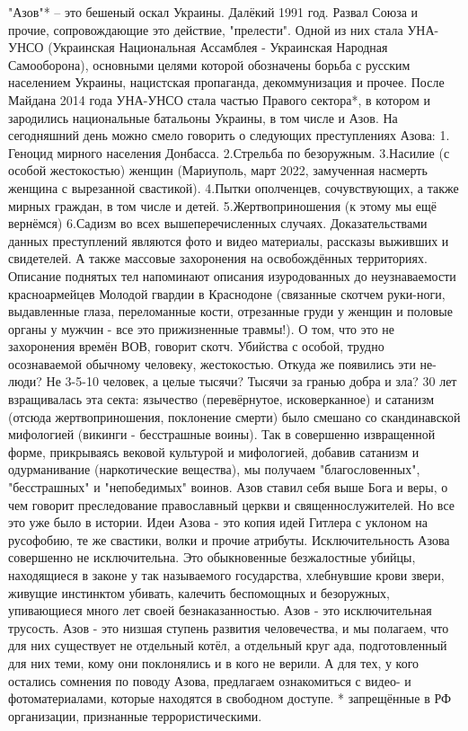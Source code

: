 "Азов"* – это бешеный оскал Украины.
Далёкий 1991 год. Развал Союза и прочие, сопровождающие это действие, "прелести". Одной из них стала УНА-УНСО (Украинская Национальная Ассамблея - Украинская Народная Самооборона), основными целями которой обозначены борьба с русским населением Украины, нацистская пропаганда, декоммунизация и прочее. После Майдана 2014 года УНА-УНСО стала частью Правого сектора*, в котором и зародились национальные батальоны Украины, в том числе и Азов.
На сегодняшний день можно смело говорить о следующих преступлениях Азова:
1. Геноцид мирного населения Донбасса.
2.Стрельба по безоружным.
3.Насилие (с особой жестокостью) женщин (Мариуполь, март 2022, замученная насмерть женщина с вырезанной свастикой).
4.Пытки ополченцев, сочувствующих, а также мирных граждан, в том числе и детей.
5.Жертвоприношения (к этому мы ещё вернёмся)
6.Садизм во всех вышеперечисленных случаях.
Доказательствами данных преступлений являются фото и видео материалы, рассказы выживших и свидетелей. А также массовые захоронения на освобождённых территориях. Описание поднятых тел напоминают описания изуродованных до неузнаваемости красноармейцев Молодой гвардии в Краснодоне (связанные скотчем руки-ноги, выдавленные глаза, переломанные кости, отрезанные груди у женщин и половые органы у мужчин - все это прижизненные травмы!). О том, что это не захоронения времён ВОВ, говорит скотч.
Убийства с особой, трудно осознаваемой обычному человеку, жестокостью.
Откуда же появились эти не-люди? Не 3-5-10 человек, а целые тысячи? Тысячи за гранью добра и зла?
30 лет взращивалась эта секта: язычество (перевёрнутое, исковерканное) и сатанизм (отсюда жертвоприношения, поклонение смерти) было смешано со скандинавской мифологией (викинги - бесстрашные воины).
Так в совершенно извращенной форме, прикрываясь вековой культурой и мифологией, добавив сатанизм и одурманивание (наркотические вещества), мы получаем "благословенных", "бесстрашных" и "непобедимых" воинов. Азов ставил себя выше Бога и веры, о чем говорит преследование православный церкви и священнослужителей.
Но все это уже было в истории.
Идеи Азова - это копия идей Гитлера с уклоном на русофобию, те же свастики, волки и прочие атрибуты.
Исключительность Азова совершенно не исключительна. Это обыкновенные безжалостные убийцы, находящиеся в законе у так называемого государства, хлебнувшие крови звери, живущие инстинктом убивать, калечить беспомощных и безоружных, упивающиеся много лет своей безнаказанностью.
Азов - это исключительная трусость.
Азов - это низшая ступень развития человечества, и мы полагаем, что для них существует не отдельный котёл, а отдельный круг ада, подготовленный для них теми, кому они поклонялись и в кого не верили.
А для тех, у кого остались сомнения по поводу Азова, предлагаем ознакомиться с видео- и фотоматериалами, которые находятся в свободном доступе.
* запрещённые в РФ организации, признанные террористическими.

